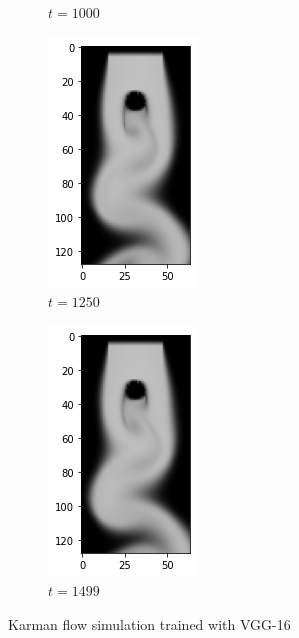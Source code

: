 \documentclass[a4paper,12pt,twoside]{report}
\begin{document}
\begin{figure}
\begin{subfigure}{0.18\textwidth}
		\caption{$t=1000$}
	\end{subfigure}
	\begin{subfigure}{0.18\textwidth}
		\centering
		\includegraphics[scale=0.5]{karmanflow/vgg_density_001250.png}
		\caption{$t=1250$}
	\end{subfigure}
	\begin{subfigure}{0.18\textwidth}
		\centering
		\includegraphics[scale=0.5]{karmanflow/vgg_density_001499.png}
		\caption{$t=1499$}
	\end{subfigure}
	\caption{Karman flow simulation trained with VGG-16}
	\label{sol karman high vgg}
\end{figure}
\end{document}
